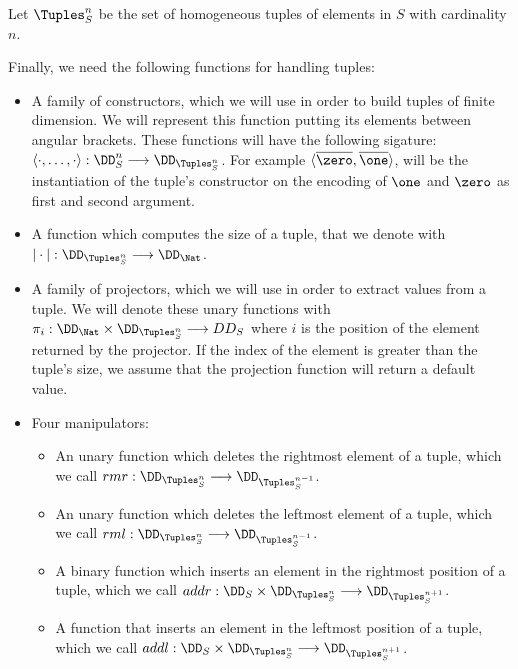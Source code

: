 \begin{defn}
Let $\Tuples_S^n$  be the set of homogeneous tuples of elements in $S$ with cardinality $n$.
\end{defn}

Finally, we need the following functions for handling tuples:

\begin{itemize}
\item A family of constructors, which we will use in order to build tuples of finite dimension. We will represent this function putting its elements between angular brackets. These functions will have the following sigature: $\langle \cdot, \ldots, \cdot\rangle : \DD_{S}^n \longrightarrow  \DD_{\Tuples_S^n}$. For example $\langle \overline \zero, \overline \one\rangle$, will be the instantiation of the tuple's constructor on the encoding of $\one$ and $\zero$ as first and second argument.
\item A function which computes the size of a tuple, that we denote with $|\cdot|: \DD_{\Tuples_S^n} \longrightarrow \DD_\Nat$.
\item A family of projectors, which we will use in order to extract values from a tuple. We will denote these unary functions with $\pi_i: \DD_\Nat \times \DD_{\Tuples_S^n}\longrightarrow DD_S$ where $i$ is the position of the element returned by the projector. If the index of the element is greater than the tuple's size, we assume that the projection function will return a default value.
\item Four manipulators:
 \begin{itemize}
 \item An unary function which deletes the rightmost element of a tuple, which we call $rmr: \DD_{\Tuples_S^n} \longrightarrow \DD_{\Tuples_S^{n-1}}$.
 \item An unary function which deletes the leftmost element of a tuple, which we call $rml: \DD_{\Tuples_S^n} \longrightarrow \DD_{\Tuples_S^{n-1}}$.
 \item A binary function which inserts an element in the rightmost position of a tuple, which we call $addr:\DD_S \times \DD_{\Tuples_S^n} \longrightarrow \DD_{\Tuples_S^{n+1}}$.
 \item A function that inserts an element in the leftmost position of a tuple, which we call $addl:\DD_S \times \DD_{\Tuples_S^n} \longrightarrow \DD_{\Tuples_S^{n+1}}$.
 \end{itemize}
\end{itemize}

